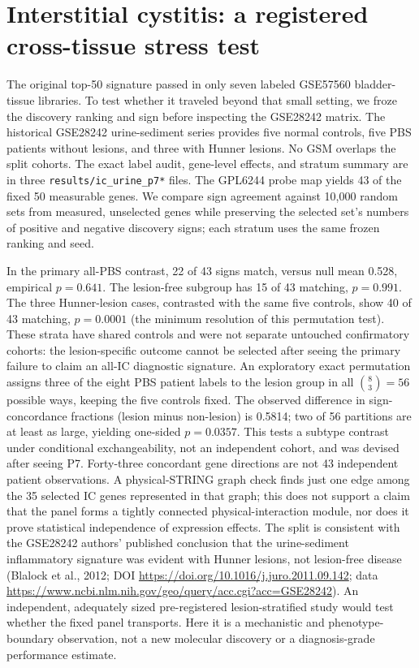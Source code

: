 \documentclass[11pt,a4paper]{article}
\begin{document}
\section{Interstitial cystitis: a registered cross-tissue stress test}
The original top-50 signature passed in only seven labeled GSE57560 bladder-tissue libraries. To test whether it traveled beyond that small setting, we froze the discovery ranking and sign before inspecting the GSE28242 matrix. The historical GSE28242 urine-sediment series provides five normal controls, five PBS patients without lesions, and three with Hunner lesions. No GSM overlaps the split cohorts. The exact label audit, gene-level effects, and stratum summary are in three \texttt{results/ic\_urine\_p7*} files. The GPL6244 probe map yields 43 of the fixed 50 measurable genes. We compare sign agreement against 10,000 random sets from measured, unselected genes while preserving the selected set's numbers of positive and negative discovery signs; each stratum uses the same frozen ranking and seed.

In the primary all-PBS contrast, 22 of 43 signs match, versus null mean 0.528, empirical $p=0.641$. The lesion-free subgroup has 15 of 43 matching, $p=0.991$. The three Hunner-lesion cases, contrasted with the same five controls, show 40 of 43 matching, $p=0.0001$ (the minimum resolution of this permutation test). These strata have shared controls and were not separate untouched confirmatory cohorts: the lesion-specific outcome cannot be selected after seeing the primary failure to claim an all-IC diagnostic signature. An exploratory exact permutation assigns three of the eight PBS patient labels to the lesion group in all $\binom{8}{3}=56$ possible ways, keeping the five controls fixed. The observed difference in sign-concordance fractions (lesion minus non-lesion) is 0.5814; two of 56 partitions are at least as large, yielding one-sided $p=0.0357$. This tests a subtype contrast under conditional exchangeability, not an independent cohort, and was devised after seeing P7. Forty-three concordant gene directions are not 43 independent patient observations. A physical-STRING graph check finds just one edge among the 35 selected IC genes represented in that graph; this does not support a claim that the panel forms a tightly connected physical-interaction module, nor does it prove statistical independence of expression effects. The split is consistent with the GSE28242 authors' published conclusion that the urine-sediment inflammatory signature was evident with Hunner lesions, not lesion-free disease (Blalock et al., 2012; DOI \url{https://doi.org/10.1016/j.juro.2011.09.142}; data \url{https://www.ncbi.nlm.nih.gov/geo/query/acc.cgi?acc=GSE28242}). An independent, adequately sized pre-registered lesion-stratified study would test whether the fixed panel transports. Here it is a mechanistic and phenotype-boundary observation, not a new molecular discovery or a diagnosis-grade performance estimate.
\end{document}
